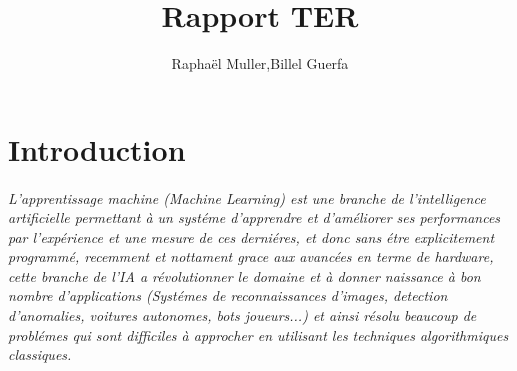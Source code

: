 \documentclass[a4paper,10pt]{article}
\begin{document}
\title{Rapport TER}
\author{Raphaël Muller,Billel Guerfa}
\maketitle

\part{Introduction}
\paragraph{ 
L'apprentissage machine (Machine Learning) est une branche de l'intelligence artificielle permettant à un systéme d'apprendre et d'améliorer ses performances par l'expérience et une mesure de ces derniéres, et donc sans étre explicitement programmé, recemment et nottament grace aux avancées en terme de hardware, cette branche de l'IA a révolutionner le domaine et à donner naissance à bon nombre d'applications (Systémes de reconnaissances d'images, detection d'anomalies, voitures autonomes, bots joueurs...) et ainsi résolu beaucoup de problémes qui sont difficiles à approcher en utilisant les techniques algorithmiques classiques.
}
\end{document}
